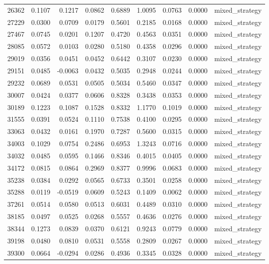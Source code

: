\begin{tabular}{lrrrrrrrl}
26362 & 0.1107 & 0.1217 & 0.0862 & 0.6889 & 1.0095 & 0.0763 & 0.0000 & mixed_strategy \\
27229 & 0.0300 & 0.0709 & 0.0179 & 0.5601 & 0.2185 & 0.0168 & 0.0000 & mixed_strategy \\
27467 & 0.0745 & 0.0201 & 0.1207 & 0.4720 & 0.4563 & 0.0351 & 0.0000 & mixed_strategy \\
28085 & 0.0572 & 0.0103 & 0.0280 & 0.5180 & 0.4358 & 0.0296 & 0.0000 & mixed_strategy \\
29019 & 0.0356 & 0.0451 & 0.0452 & 0.6442 & 0.3107 & 0.0230 & 0.0000 & mixed_strategy \\
29151 & 0.0485 & -0.0063 & 0.0432 & 0.5035 & 0.2948 & 0.0244 & 0.0000 & mixed_strategy \\
29232 & 0.0689 & 0.0531 & 0.0505 & 0.5034 & 0.5460 & 0.0347 & 0.0000 & mixed_strategy \\
30007 & 0.0424 & 0.0377 & 0.0606 & 0.8328 & 0.3438 & 0.0353 & 0.0000 & mixed_strategy \\
30189 & 0.1223 & 0.1087 & 0.1528 & 0.8332 & 1.1770 & 0.1019 & 0.0000 & mixed_strategy \\
31555 & 0.0391 & 0.0524 & 0.1110 & 0.7538 & 0.4100 & 0.0295 & 0.0000 & mixed_strategy \\
33063 & 0.0432 & 0.0161 & 0.1970 & 0.7287 & 0.5600 & 0.0315 & 0.0000 & mixed_strategy \\
34003 & 0.1029 & 0.0754 & 0.2486 & 0.6953 & 1.3243 & 0.0716 & 0.0000 & mixed_strategy \\
34032 & 0.0485 & 0.0595 & 0.1466 & 0.8346 & 0.4015 & 0.0405 & 0.0000 & mixed_strategy \\
34172 & 0.0815 & 0.0864 & 0.2969 & 0.8377 & 0.9996 & 0.0683 & 0.0000 & mixed_strategy \\
35238 & 0.0384 & 0.0292 & 0.0565 & 0.6733 & 0.3501 & 0.0258 & 0.0000 & mixed_strategy \\
35288 & 0.0119 & -0.0519 & 0.0609 & 0.5243 & 0.1409 & 0.0062 & 0.0000 & mixed_strategy \\
37261 & 0.0514 & 0.0580 & 0.0513 & 0.6031 & 0.4489 & 0.0310 & 0.0000 & mixed_strategy \\
38185 & 0.0497 & 0.0525 & 0.0268 & 0.5557 & 0.4636 & 0.0276 & 0.0000 & mixed_strategy \\
38344 & 0.1273 & 0.0839 & 0.0370 & 0.6121 & 0.9243 & 0.0779 & 0.0000 & mixed_strategy \\
39198 & 0.0480 & 0.0810 & 0.0531 & 0.5558 & 0.2809 & 0.0267 & 0.0000 & mixed_strategy \\
39300 & 0.0664 & -0.0294 & 0.0286 & 0.4936 & 0.3345 & 0.0328 & 0.0000 & mixed_strategy \\

\end{tabular}
